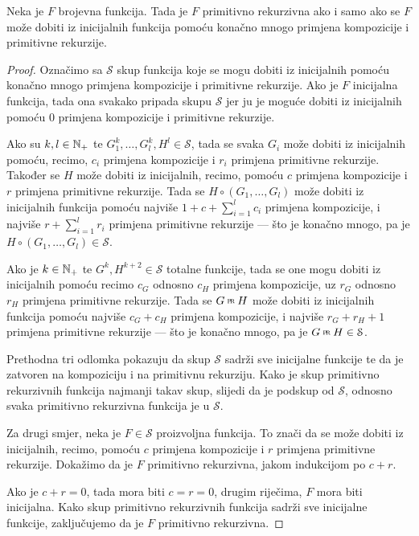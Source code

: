 \begin{propozicija}[{name=[simboličke definicije primitivno rekurzivnih funkcija]}]\label{prop:symbdef}
Neka je $F$ brojevna funkcija. Tada je $F$ primitivno rekurzivna ako i samo ako se $F$ može dobiti iz inicijalnih funkcija pomoću konačno mnogo primjena kompozicije i primitivne rekurzije.
\end{propozicija}
\begin{proof}
Označimo sa $\mathcal S$ skup funkcija koje se mogu dobiti iz inicijalnih pomoću ko\-nač\-no mnogo primjena kompozicije i primitivne rekurzije. Ako je $F$ inicijalna funkcija, tada ona svakako pripada skupu $\mathcal S$ jer ju je moguće dobiti iz inicijalnih pomoću $0$ primjena kompozicije i primitivne rekurzije.

Ako su $k,l\in{\mathbb N}_+$ te $G_1^k,\dotsc,G_l^k,H^l\in\mathcal S$, tada se svaka $G_i$ može dobiti iz inicijalnih pomoću, recimo, $c_i$ primjena kompozicije i $r_i$ primjena primitivne rekurzije. Također se $H$ može dobiti iz inicijalnih, recimo, pomoću $c$ primjena kompozicije i $r$ primjena primitivne rekurzije. Tada se $H\circ(G_1,\dotsc,G_l)$ može dobiti iz inicijalnih funkcija pomoću najviše $1+c+\sum_{i=1}^lc_i$ primjena kompozicije, i najviše $r+\sum_{i=1}^lr_i$ primjena primitivne rekurzije --- što je konačno mnogo, pa je $H\circ(G_1,\dotsc,G_l)\in\mathcal S$.

Ako je $k\in{\mathbb N}_+$ te $G^k,H^{k+2}\in\mathcal S$ totalne funkcije, tada se one mogu dobiti iz inicijalnih pomoću recimo $c_G$ odnosno $c_H$ primjena kompozicije, uz $r_G$ odnosno $r_H$ primjena primitivne rekurzije. Tada se $G\pr H$ može dobiti iz inicijalnih funkcija pomoću najviše $c_G+c_H$ primjena kompozicije, i najviše $r_G+r_H+1$ primjena primitivne rekurzije --- što je konačno mnogo, pa je $G\pr H\in\mathcal S$.

Prethodna tri odlomka pokazuju da skup $\mathcal S$ sadrži sve inicijalne funkcije te da je zatvoren na kompoziciju i na primitivnu rekurziju. Kako je skup primitivno rekurzivnih funkcija najmanji takav skup, slijedi da je podskup od $\mathcal S$, odnosno svaka primitivno rekurzivna funkcija je u $\mathcal S$.

Za drugi smjer, neka je $F\in\mathcal S$ proizvoljna funkcija. To znači da se može dobiti iz inicijalnih, recimo, pomoću $c$ primjena kompozicije i $r$ primjena primitivne rekurzije. Dokažimo da je $F$ primitivno rekurzivna, jakom indukcijom po $c+r$.

Ako je $c+r=0$, tada mora biti $c=r=0$, drugim riječima, $F$ mora biti inicijalna. Kako skup primitivno rekurzivnih funkcija sadrži sve inicijalne funkcije, zaključujemo da je $F$ primitivno rekurzivna.


\end{proof}
